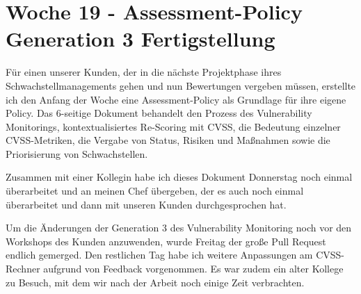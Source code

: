 \section{Woche 19 - Assessment-Policy \headerand Generation 3 Fertigstellung} \label{sec:bericht-wo-19}


\lweekdaymarginpar{\weekdayMondayShort, \weekdayTuesdayShort, \weekdayWednesdayShort}

Für einen unserer Kunden, der in die nächste Projektphase ihres Schwachstellmanagements gehen und nun Bewertungen vergeben müssen, erstellte ich den Anfang der Woche eine Assessment-Policy als Grundlage für ihre eigene Policy.
Das 6-seitige Dokument behandelt den Prozess des Vulnerability Monitorings, kontextualisiertes Re-Scoring mit CVSS, die Bedeutung einzelner CVSS-Metriken, die Vergabe von Status, Risiken und Maßnahmen sowie die Priorisierung von Schwachstellen.

\sweekdaymarginpar{\weekdayThursdayLong}

Zusammen mit einer Kollegin habe ich dieses Dokument Donnerstag noch einmal überarbeitet und an meinen Chef übergeben, der es auch noch einmal überarbeitet und dann mit unseren Kunden durchgesprochen hat.

\sweekdaymarginpar{\weekdayFridayLong}

Um die Änderungen der Generation 3 des Vulnerability Monitoring noch vor den Workshops des Kunden anzuwenden, wurde Freitag der große Pull Request endlich gemerged.
Den restlichen Tag habe ich weitere Anpassungen am CVSS-Rechner aufgrund von Feedback vorgenommen.
Es war zudem ein alter Kollege zu Besuch, mit dem wir nach der Arbeit noch einige Zeit verbrachten.
